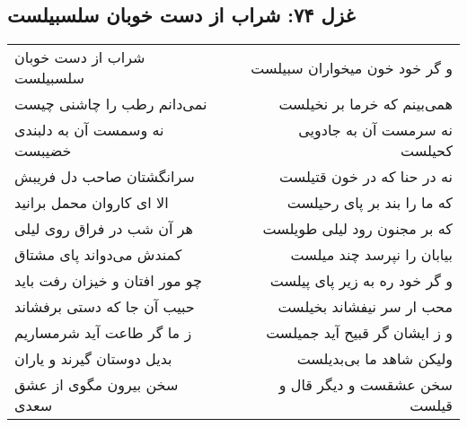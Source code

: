 \begin{center}
\section*{غزل ۷۴: شراب از دست خوبان سلسبیلست}
\label{sec:074}
\begin{longtable}{l p{0.5cm} r}
شراب از دست خوبان سلسبیلست
&&
و گر خود خون میخواران سبیلست
\\
نمی‌دانم رطب را چاشنی چیست
&&
همی‌بینم که خرما بر نخیلست
\\
نه وسمست آن به دلبندی خضیبست
&&
نه سرمست آن به جادویی کحیلست
\\
سرانگشتان صاحب دل فریبش
&&
نه در حنا که در خون قتیلست
\\
الا ای کاروان محمل برانید
&&
که ما را بند بر پای رحیلست
\\
هر آن شب در فراق روی لیلی
&&
که بر مجنون رود لیلی طویلست
\\
کمندش می‌دواند پای مشتاق
&&
بیابان را نپرسد چند میلست
\\
چو مور افتان و خیزان رفت باید
&&
و گر خود ره به زیر پای پیلست
\\
حبیب آن جا که دستی برفشاند
&&
محب ار سر نیفشاند بخیلست
\\
ز ما گر طاعت آید شرمساریم
&&
و ز ایشان گر قبیح آید جمیلست
\\
بدیل دوستان گیرند و یاران
&&
ولیکن شاهد ما بی‌بدیلست
\\
سخن بیرون مگوی از عشق سعدی
&&
سخن عشقست و دیگر قال و قیلست
\\
\end{longtable}
\end{center}
